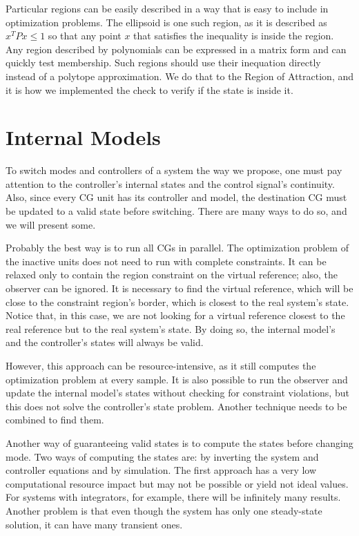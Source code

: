 Particular regions can be easily described in a way that is easy to include in
optimization problems. The ellipsoid is one such region, as it is described as
\(x^{T}Px\leq{}1\) so that any point \(x\) that satisfies the inequality is inside
the region. Any region described by polynomials can be expressed in a matrix
form and can quickly test membership. Such regions should use their inequation
directly instead of a polytope approximation.  We do that to the Region of
Attraction, and it is how we implemented the check to verify if the state is
inside it.

\section{Internal Models}%
\label{sec:internal-models}

To switch modes and controllers of a system the way we propose, one must pay
attention to the controller's internal states and the control signal's
continuity. Also, since every CG unit has its controller and model, the
destination CG must be updated to a valid state before switching. There are many
ways to do so, and we will present some.

Probably the best way is to run all CGs in parallel. The optimization problem of
the inactive units does not need to run with complete constraints. It can be
relaxed only to contain the region constraint on the virtual reference; also,
the observer can be ignored. It is necessary to find the virtual reference,
which will be close to the constraint region's border, which is closest to the
real system's state. Notice that, in this case, we are not looking for a virtual
reference closest to the real reference but to the real system's state. By doing
so, the internal model's and the controller's states will always be valid.

However, this approach can be resource-intensive, as it still computes the
optimization problem at every sample. It is also possible to run the observer
and update the internal model's states without checking for constraint
violations, but this does not solve the controller's state problem. Another
technique needs to be combined to find them.

Another way of guaranteeing valid states is to compute the states before
changing mode. Two ways of computing the states are: by inverting the system and
controller equations and by simulation. The first approach has a very low
computational resource impact but may not be possible or yield not ideal values.
For systems with integrators, for example, there will be infinitely many
results. Another problem is that even though the system has only one
steady-state solution, it can have many transient ones.

